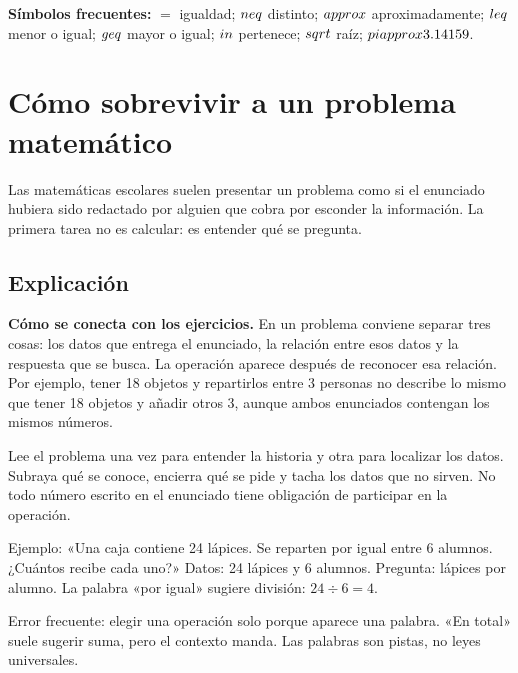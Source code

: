 \documentclass[10pt,oneside,openany]{book}
\begin{document}
\textbf{Símbolos frecuentes:} $=$ igualdad; $\\neq$ distinto; $\\approx$ aproximadamente; $\\leq$ menor o igual; $\\geq$ mayor o igual; $\\in$ pertenece; $\\sqrt{}$ raíz; $\\pi\\approx3.14159$.
\tableofcontents
\mainmatter

\chapter{Cómo sobrevivir a un problema matemático}

\begin{idea}
Las matemáticas escolares suelen presentar un problema como si el enunciado hubiera sido redactado por alguien que cobra por esconder la información. La primera tarea no es calcular: es entender qué se pregunta.
\end{idea}

\section{Explicación}

\textbf{Cómo se conecta con los ejercicios.} En un problema conviene separar tres cosas: los datos que entrega el enunciado, la relación entre esos datos y la respuesta que se busca. La operación aparece después de reconocer esa relación. Por ejemplo, tener 18 objetos y repartirlos entre 3 personas no describe lo mismo que tener 18 objetos y añadir otros 3, aunque ambos enunciados contengan los mismos números.

Lee el problema una vez para entender la historia y otra para localizar los datos. Subraya qué se conoce, encierra qué se pide y tacha los datos que no sirven. No todo número escrito en el enunciado tiene obligación de participar en la operación.



\begin{ejemplo}
Ejemplo: «Una caja contiene 24 lápices. Se reparten por igual entre 6 alumnos. ¿Cuántos recibe cada uno?» Datos: 24 lápices y 6 alumnos. Pregunta: lápices por alumno. La palabra «por igual» sugiere división: $24\div6=4$.
\end{ejemplo}

\begin{ojo}
Error frecuente: elegir una operación solo porque aparece una palabra. «En total» suele sugerir suma, pero el contexto manda. Las palabras son pistas, no leyes universales.
\end{ojo}
\end{document}
